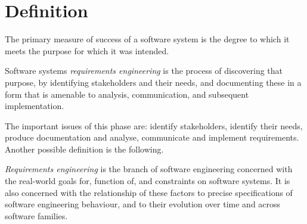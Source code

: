 \documentclass[12pt, a4paper]{report}
\newtheorem[style=M,bodystyle=\normalfont]{theorem}{Theorem}
\newtheorem[style=M,bodystyle=\normalfont]{corollary}{Corollary}
\newtheorem[style=M,bodystyle=\normalfont]{lemma}{Lemma}
\newtheorem[style=M,bodystyle=\normalfont]{definition}{Definition}
\begin{document}
    \section{Definition}
    The primary measure of success of a software system is the degree to which it meets the purpose for which it was intended.
    \begin{definition}
        Software systems \emph{requirements engineering} is the process of discovering that purpose, by identifying stakeholders and their needs, and documenting these in a form that 
        is amenable to analysis, communication, and subsequent implementation. 
    \end{definition}
    The important issues of this phase are: identify stakeholders, identify their needs, produce documentation and analyse, communicate and implement requirements. Another possible 
    definition is the following. 
    \begin{definition}
        \emph{Requirements engineering} is the branch of software engineering concerned with the real-world goals for, function of, and constraints on software systems. It is also 
        concerned with the relationship of these factors to precise specifications of software engineering behaviour, and to their evolution over time and across software families. 
    \end{definition}
\end{document}
